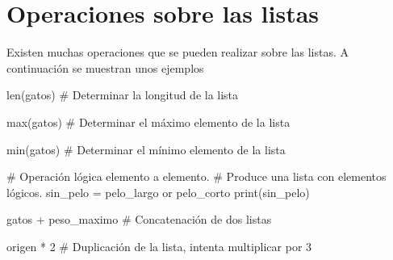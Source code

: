 \documentclass[
  letterpaper,
  DIV=11,
  numbers=noendperiod]{scrreprt}
\newenvironment{Shaded}{\begin{snugshade}}{\end{snugshade}}
\newcommand{\BuiltInTok}[1]{\textcolor[rgb]{0.00,0.23,0.31}{#1}}
\newcommand{\CommentTok}[1]{\textcolor[rgb]{0.37,0.37,0.37}{#1}}
\newcommand{\DecValTok}[1]{\textcolor[rgb]{0.68,0.00,0.00}{#1}}
\newcommand{\KeywordTok}[1]{\textcolor[rgb]{0.00,0.23,0.31}{#1}}
\newcommand{\NormalTok}[1]{\textcolor[rgb]{0.00,0.23,0.31}{#1}}
\newcommand{\OperatorTok}[1]{\textcolor[rgb]{0.37,0.37,0.37}{#1}}
\begin{document}
\section{Operaciones sobre las
listas}\label{operaciones-sobre-las-listas}

Existen muchas operaciones que se pueden realizar sobre las listas. A
continuación se muestran unos ejemplos

\begin{Shaded}
\begin{Highlighting}[]
\BuiltInTok{len}\NormalTok{(gatos) }\CommentTok{\# Determinar la longitud de la lista}
\end{Highlighting}
\end{Shaded}

\begin{Shaded}
\begin{Highlighting}[]
\BuiltInTok{max}\NormalTok{(gatos) }\CommentTok{\# Determinar el máximo elemento de la lista}
\end{Highlighting}
\end{Shaded}

\begin{Shaded}
\begin{Highlighting}[]
\BuiltInTok{min}\NormalTok{(gatos) }\CommentTok{\# Determinar el mínimo elemento de la lista}
\end{Highlighting}
\end{Shaded}

\begin{Shaded}
\begin{Highlighting}[]
\CommentTok{\# Operación lógica elemento a elemento.}
\CommentTok{\# Produce una lista con elementos lógicos.}
\NormalTok{sin\_pelo }\OperatorTok{=}\NormalTok{ pelo\_largo }\KeywordTok{or}\NormalTok{ pelo\_corto}
\BuiltInTok{print}\NormalTok{(sin\_pelo)}
\end{Highlighting}
\end{Shaded}

\begin{Shaded}
\begin{Highlighting}[]
\NormalTok{gatos }\OperatorTok{+}\NormalTok{ peso\_maximo }\CommentTok{\# Concatenación de dos listas}
\end{Highlighting}
\end{Shaded}

\begin{Shaded}
\begin{Highlighting}[]
\NormalTok{origen }\OperatorTok{*} \DecValTok{2} \CommentTok{\# Duplicación de la lista, intenta multiplicar por 3}
\end{Highlighting}
\end{Shaded}
\end{document}
